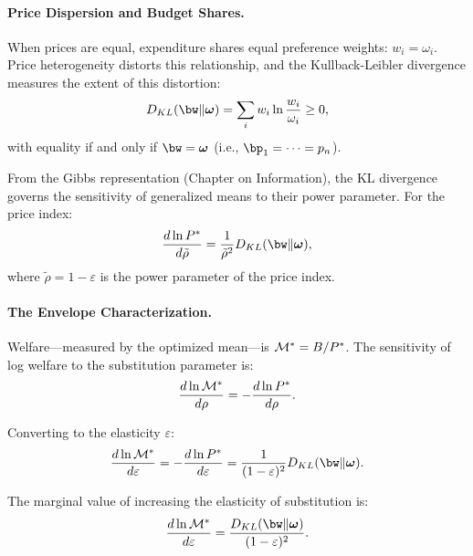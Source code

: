 \paragraph{Price Dispersion and Budget Shares.}

When prices are equal, expenditure shares equal preference weights: $w_i = \omega_i$. Price heterogeneity distorts this relationship, and the Kullback-Leibler divergence measures the extent of this distortion:
\begin{equation}
D_{KL}(\bw \| \bom) = \sum_i w_i \ln \frac{w_i}{\omega_i} \geq 0,
\end{equation}
with equality if and only if $\bw = \bom$ (i.e., $\bp_1 = \cdots = p_n$).

From the Gibbs representation (Chapter on Information), the KL divergence governs the sensitivity of generalized means to their power parameter. For the price index:
\begin{equation}
\frac{d \ln \Pstar}{d\tilde{\rho}} = \frac{1}{\tilde{\rho}^2} D_{KL}(\bw \| \bom),
\end{equation}
where $\tilde{\rho} = 1 - \varepsilon$ is the power parameter of the price index.

\paragraph{The Envelope Characterization.}

Welfare---measured by the optimized mean---is $\mathcal{M}^{*} = B / P^{*}$. The sensitivity of log welfare to the substitution parameter is:
\begin{equation}
\frac{d \ln \mathcal{M}^{*}}{d\rho} = -\frac{d \ln P^{*}}{d\rho}.
\end{equation}

Converting to the elasticity $\varepsilon$:
\begin{equation}
\frac{d \ln \M\opt}{d\varepsilon} = -\frac{d \ln \Pstar}{d\varepsilon} = \frac{1}{(1-\varepsilon)^2} D_{KL}(\bw \| \bom).
\end{equation}

\begin{proposition}
\label{prop:welfare-sensitivity}
The marginal value of increasing the elasticity of substitution is:
\begin{equation}
\label{eq:welfare-sensitivity}
\frac{d \ln \M\opt}{d\varepsilon} = \frac{D_{KL}(\bw \| \bom)}{(1-\varepsilon)^2}.
\end{equation}
\end{proposition}

